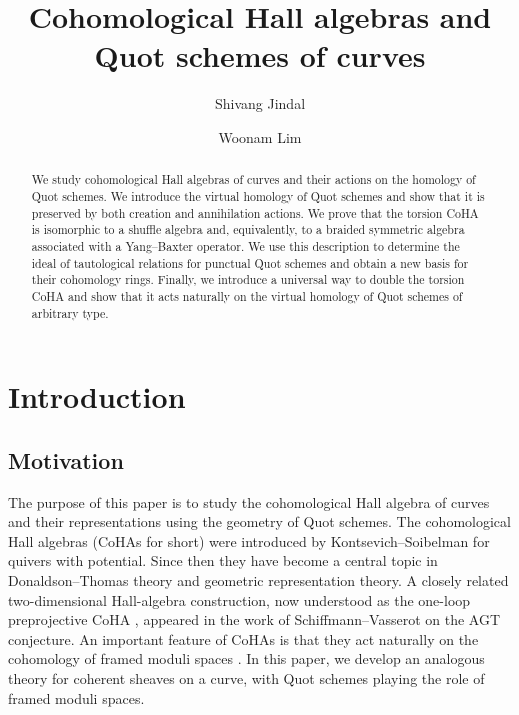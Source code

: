 \documentclass[10pt]{amsart}
\title{Cohomological Hall algebras and Quot schemes of curves}
\author[S. Jindal]{Shivang Jindal}
\author[W. Lim]{Woonam Lim}
\newcommand{\+}{{}^+}
\theoremstyle{definition}
\theoremstyle {definition}
\theoremstyle {definition}
\begin{document}
\begin{abstract}

We study cohomological Hall algebras of curves and their actions on the homology of Quot schemes. We introduce the virtual homology of Quot schemes and show that it is preserved by both creation and annihilation actions. We prove that the torsion CoHA is isomorphic to a shuffle algebra and, equivalently, to a braided symmetric algebra associated with a Yang–Baxter operator. We use this description to determine the ideal of tautological relations for punctual Quot schemes and obtain a new basis for their cohomology rings. Finally, we introduce a universal way to double the torsion CoHA and show that it acts naturally on the virtual homology of Quot schemes of arbitrary type.

\end{abstract}

\baselineskip=16pt
\maketitle
\vspace{-23pt}
\tableofcontents



\section{Introduction}

\subsection{Motivation}

The purpose of this paper is to study the cohomological Hall algebra of curves and their representations using the geometry of Quot schemes. The cohomological Hall algebras (CoHAs for short) were introduced by Kontsevich--Soibelman \cite{Kontsevich_Soibelman} for quivers with potential. Since then they have become a central topic in Donaldson--Thomas theory and geometric representation theory. A closely related two-dimensional Hall-algebra construction, now understood as the one-loop preprojective CoHA \cite{YZ}, appeared in the work of Schiffmann--Vasserot \cite{schiffmannvasserotcherednik} on the AGT conjecture. An important feature of CoHAs is that they act naturally on the cohomology of framed moduli spaces \cite{schiffmannvasserotcherednik, Soibelman,franzen, Davison_Meinhardt,Minets,young,YZ, giacomini}. In this paper, we develop an analogous theory for coherent sheaves on a curve, with Quot schemes playing the role of framed moduli spaces. 
\end{document}
